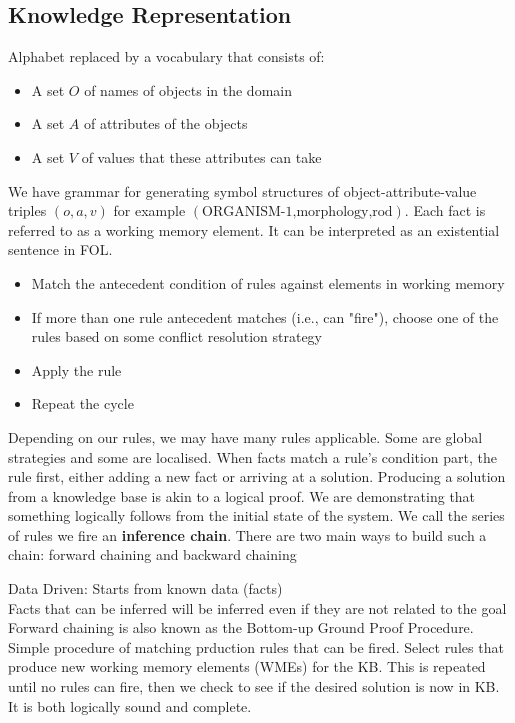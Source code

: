 \documentclass[a4paper]{article}
\theoremstyle{plain}
\theoremstyle{definition}
\newtheorem{defn}{Definition}[section]
\theoremstyle{remark}
\begin{document}
\subsection{Knowledge Representation}
Alphabet replaced by a vocabulary that consists of:
\begin{itemize}
	\item A set $O$ of names of objects in the domain
	\item A set $A$ of attributes of the objects
	\item A set $V$ of values that these attributes can take
\end{itemize}
We have grammar for generating symbol structures of object-attribute-value triples $(o,a,v)$ for example $(\text{ORGANISM-1,morphology,rod})$. Each fact is referred to as a working memory element. It can be interpreted as an existential sentence in FOL.
\begin{tcolorbox}[colback=black!3!white,colframe=black!60!white,title=\begin{defn}Recognise-act Cycle \label{Recognise-act Cycle}\end{defn}]
\begin{itemize}
	\item Match the antecedent condition of rules against elements in working memory
	\item If more than one rule antecedent matches (i.e., can "fire"), choose one of the rules based on some conflict resolution strategy
	\item Apply the rule
	\item Repeat the cycle
\end{itemize}
\end{tcolorbox}
Depending on our rules, we may have many rules applicable. Some are global strategies and some are localised. When facts match a rule's condition part, the rule first, either adding a new fact or arriving at a solution. Producing a solution from a knowledge base is akin to a logical proof. We are demonstrating that something logically follows from the initial state of the system. We call the series of rules we fire an \textbf{inference chain}. There are two main ways to build such a chain: forward chaining and backward chaining
\begin{tcolorbox}[colback=black!3!white,colframe=black!60!white,title=\begin{defn}Forward Chaining \label{Forward Chaining}\end{defn}]
Data Driven: Starts from known data (facts)\\
Facts that can be inferred will be inferred even if they are not related to the goal\\
Forward chaining is also known as the Bottom-up Ground Proof Procedure. Simple procedure of matching prduction rules that can be fired. Select rules that produce new working memory elements (WMEs) for the KB. This is repeated until no rules can fire, then we check to see if the desired solution is now in KB. It is both logically sound and complete.
\end{tcolorbox}
\end{document}

